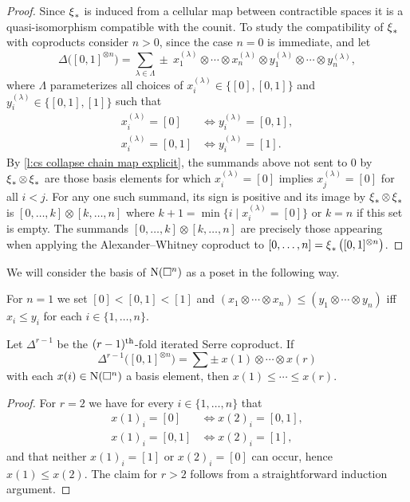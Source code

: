 \begin{proof}
	Since $\operatorname{\xi}_\ast$ is induced from a cellular map between contractible spaces it is a quasi-isomorphism compatible with the counit.
	To study the compatibility of $\operatorname{\xi}_\ast$ with coproducts consider $n > 0$, since the case $n = 0$ is immediate, and let
	\[
	\Delta \big( [0,1]^{\otimes n} \big) = \sum_{\lambda \in \Lambda} \pm \ x_1^{(\lambda)} \otimes \cdots \otimes x_n^{(\lambda)} \otimes y_1^{(\lambda)} \otimes \cdots \otimes y_n^{(\lambda)},
	\]
	where $\Lambda$ parameterizes all choices of $x_i^{(\lambda)} \in \{[0], [0,1]\}$ and $y_i^{(\lambda)} \in \{[0,1], [1]\}$ such that
	\begin{align*}
	x_i^{(\lambda)} = [0]   & \iff y_i^{(\lambda)} = [0,1], \\
	x_i^{(\lambda)} = [0,1] & \iff y_i^{(\lambda)} = [1].
	\end{align*}
	By \cref{l:cs collapse chain map explicit}, the summands above not sent to $0$ by $\operatorname{\xi}_\ast \otimes \operatorname{\xi}_\ast$ are those basis elements for which $x_i^{(\lambda)} = [0]$ implies $x_j^{(\lambda)} = [0]$ for all $i < j$.
	For any one such summand, its sign is positive and its image by $\operatorname{\xi}_\ast \otimes \operatorname{\xi}_\ast$ is $[0, \dots, k] \otimes [k, \dots, n]$ where $k+1 = \min \{i \mid x_i^{(\lambda)} = [0]\}$ or $k = n$ if this set is empty.
	The summands $[0, \dots, k] \otimes [k, \dots, n]$ are precisely those appearing when applying the Alexander--Whitney coproduct to $[0, \dots, n] = \operatorname{\xi}_\ast \big( [0,1]^{\otimes n} \big)$.
\end{proof}

We will consider the basis of $\operatorname{N}(\square^n)$ as a poset in the following way.

\begin{definition} \label{d:partial order}
	For $n = 1$ we set $[0] < [0,1] < [1]$ and $(x_1 \otimes \cdots \otimes x_n) \leq (y_1 \otimes \cdots \otimes y_n)$ iff $x_i \leq y_i$ for each $i \in \{1, \dots, n\}$.
\end{definition}

\begin{lemma}
	Let $\Delta^{r-1}$ be the $(r-1)^{\mathrm{th}}$-fold iterated Serre coproduct.
	If
	\[
	\Delta^{r-1} \big([0,1]^{\otimes n}\big) =
	\sum \pm \ x{(1)} \otimes \cdots \otimes x{(r)}
	\]
	with each $x(i) \in \operatorname{N}(\square^n)$ a basis element, then $x{(1)} \leq \cdots \leq x{(r)}$.
\end{lemma}

\begin{proof}
	For $r = 2$ we have for every $i \in \{1, \dots, n\}$ that
	\begin{align*}
	x(1)_i = [0]   & \iff x(2)_i = [0,1], \\
	x(1)_i = [0,1] & \iff x(2)_i = [1],
	\end{align*}
	and that neither $x(1)_i = [1]$ or $x(2)_i = [0]$ can occur, hence $x(1) \leq x(2)$.
	The claim for $r > 2$ follows from a straightforward induction argument.
\end{proof}

